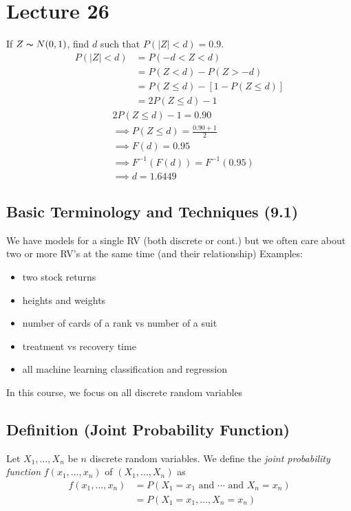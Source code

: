 \section{Lecture 26}

If $ Z \thicksim N(0,1) $, find $ d $ such that $ P(|Z|<d)=0.9 $.
\begin{align*}
    P(|Z|<d)&=P(-d<Z<d)\\
    &=P(Z<d)-P(Z>-d)\\
    &=P(Z\le d)-\left[ 1-P(Z\le d) \right]\\
    &=2P(Z\le d)-1
\end{align*}
\begin{align*}
    &2P(Z\le d)-1=0.90\\
    &\implies P(Z\le d)=\frac{0.90+1}{2}\\
    &\implies F(d)=0.95\\
    &\implies F^{-1}(F(d))=F^{-1}(0.95)\\
    &\implies d=1.6449
\end{align*}

\subsection{Basic Terminology and Techniques (9.1)}
We have models for a single RV (both discrete or cont.) but we often
care about two or more RV's at the same time (and their relationship)
Examples:
\begin{itemize}
    \item two stock returns
    \item heights and weights
    \item number of cards of a rank vs number of a suit
    \item treatment vs recovery time
    \item all machine learning classification and regression
\end{itemize}
In this course, we focus on all discrete random variables

\begin{defbox}
    \subsection{Definition (Joint Probability Function)}
    Let $ X_1,\ldots,X_n $ be $ n $ discrete random variables.
    We define the \emph{joint probability function} $ f(x_1,\ldots,x_n) $ of
    $ (X_1,\ldots,X_n) $ as
    \begin{align*}
        f(x_1,\ldots,x_n)&=P(X_1=x_1 \text{ and } \cdots \text{ and } X_n=x_n)\\
        &=P(X_1=x_1,\ldots,X_n=x_n)
    \end{align*}
\end{defbox}

